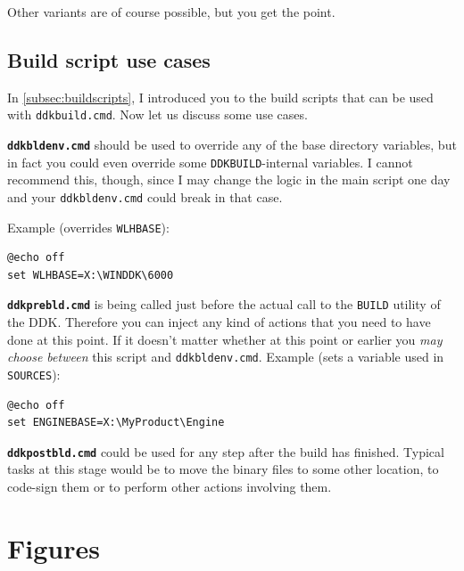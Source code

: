 \documentclass[a4paper,titlepage]{report}
\begin{document}
Other variants are of course possible, but you get the point.

\section{Build script use cases}
In \autoref{subsec:buildscripts}, I introduced you to the build scripts that can be used with
\texttt{ddkbuild.cmd}. Now let us discuss some use cases.

\textbf{\texttt{ddkbldenv.cmd}} should be used to override any of the base directory variables, but
in fact you could even override some \texttt{DDKBUILD}-internal variables. I cannot recommend
this, though, since I may change the logic in the main script one day and your \texttt{ddkbldenv.cmd}
could break in that case.

Example (overrides \texttt{WLHBASE}):

\begin{verbatim}
@echo off
set WLHBASE=X:\WINDDK\6000
\end{verbatim}

\textbf{\texttt{ddkprebld.cmd}} is being called just before the actual call to the \texttt{BUILD}
utility of the DDK. Therefore you can inject any kind of actions that you need to have done at this
point. If it doesn't matter whether at this point or earlier you \emph{may choose between} this script
and \texttt{ddkbldenv.cmd}. Example (sets a variable used in \texttt{SOURCES}):

\begin{verbatim}
@echo off
set ENGINEBASE=X:\MyProduct\Engine
\end{verbatim}

\textbf{\texttt{ddkpostbld.cmd}} could be used for any step after the build has finished. Typical
tasks at this stage would be to move the binary files to some other location, to code-sign
them or to perform other actions involving them.

\chapter{Figures}\thispagestyle{fancy}
\end{document}
